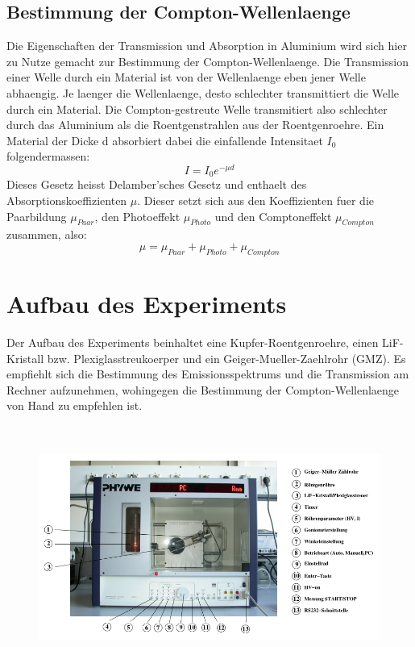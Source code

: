 \subsection{Bestimmung der Compton-Wellenlaenge}
Die Eigenschaften der Transmission und Absorption in Aluminium wird sich hier zu Nutze gemacht zur Bestimmung der Compton-Wellenlaenge. Die Transmission einer Welle durch ein Material ist von der Wellenlaenge eben jener Welle abhaengig. Je laenger die Wellenlaenge, desto schlechter transmittiert die Welle durch ein Material. Die Compton-gestreute Welle transmitiert also schlechter durch das Aluminium als die Roentgenstrahlen aus der Roentgenroehre. Ein Material der Dicke d absorbiert dabei die einfallende Intensitaet $I_0$ folgendermassen:
\begin{equation}
    I=I_0e^{-\mu d}
\end{equation}
Dieses Gesetz heisst Delamber'sches Gesetz und enthaelt des Absorptionskoeffizienten $\mu$. Dieser setzt sich aus den Koeffizienten fuer die Paarbildung $\mu_{Paar}$, den Photoeffekt $\mu_{Photo}$ und den Comptoneffekt $\mu_{Compton}$ zusammen, also:
\begin{equation}
    \mu=\mu_{Paar}+\mu_{Photo}+\mu_{Compton}
\end{equation}
\newpage \section{Aufbau des Experiments}
Der Aufbau des Experiments beinhaltet eine Kupfer-Roentgenroehre, einen LiF-Kristall bzw. Plexiglasstreukoerper und ein Geiger-Mueller-Zaehlrohr (GMZ). Es empfiehlt sich die Bestimmung des Emissionsspektrums und die Transmission am Rechner aufzunehmen, wohingegen die Bestimmung der Compton-Wellenlaenge von Hand zu empfehlen ist.
\begin{figure}[H]
    \centering
    \captionsetup{justification=centering}
    \includegraphics[height=8cm]{"Aufbau_Compton.png"}
    \label{Fig:Aufbau}
\end{figure}
